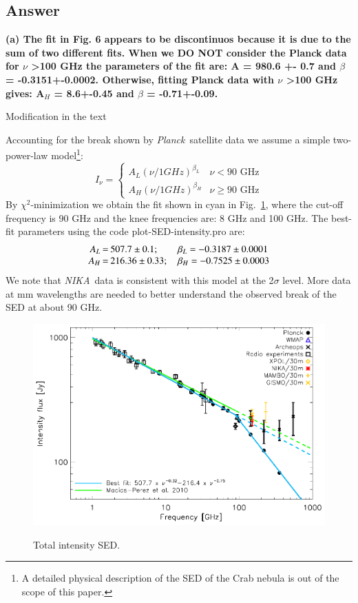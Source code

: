 \documentclass[report,twocolumn]{aa}
\def\NIKA{\textit{NIKA}}
\def\Planck{\textit{Planck}}
\begin{document}
\subsection{\textbf{Answer}}
\textbf{(a)  The fit in Fig. 6 appears to be discontinuos because it is due to the sum of two different fits. When we DO NOT consider the Planck data for $\nu$ \textgreater 100 GHz the parameters of the fit are: A = 980.6 +- 0.7 and $\beta$ = -0.3151+-0.0002.
Otherwise, fitting Planck data with $\nu$ \textgreater 100 GHz gives: A$_H$ = 8.6+-0.45 and $\beta$ = -0.71+-0.09.}

{\color{red} Modification in the text}

Accounting for the break shown by \Planck\ satellite data we assume a simple
two-power-law model\footnote{A detailed physical description of the SED of the
  Crab nebula is out of the scope of this paper.}:
\begin{equation}
I_{\nu} = \left\{ 
\begin{array}{rl}A_L(\nu/1GHz)^{\beta_L} &\mbox{$\nu<90$ GHz} \\
   A_H(\nu/1GHz)^{\beta_H} &\mbox{$\nu\geq90$ GHz}
  \end{array} \right.    
\end{equation}
By $\chi^2$-minimization we obtain the fit shown in cyan in Fig.~{\ref{crab_int_SED}},
where the cut-off frequency is 90 GHz and the knee frequencies are: 8 GHz and 100 GHz. 
The best-fit parameters using the code plot-SED-intensity.pro are:
$$\setlength\arraycolsep{0.1em}
 \begin{array}{rclcl}
  A_L&=& 507.7\pm0.1 ; \quad \quad   \beta_L = -0.3187\pm0.0001\\
  A_H&=& 216.36\pm0.33 ; \quad \beta_H = -0.7525\pm0.0003
 \end{array}
$$
We note that \NIKA\ data is consistent with this model at the 2$\sigma$ level. More data at mm wavelengths are needed to better understand the observed break of the SED at about 90 GHz. 



\begin{figure}[!ht]
\centering
     	  { \includegraphics[width=1\linewidth,keepaspectratio]{referee_figures/Crab_SED_int_test.pdf}}
\caption{Total intensity SED.}     	  
 
\label{crab_int_SED}
\end{figure}
\end{document}
